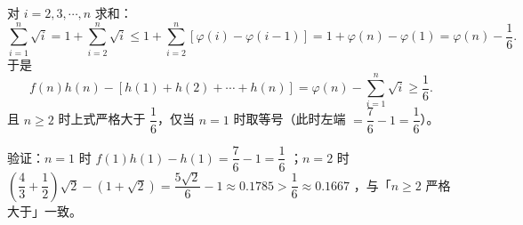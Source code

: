 \begin{answer}
对 $i=2,3,\cdots,n$ 求和：
\nopagebreak[4]
\[
\sum_{i=1}^{n}\sqrt i=1+\sum_{i=2}^{n}\sqrt i\leqslant 1+\sum_{i=2}^{n}\left[\varphi(i)-\varphi(i-1)\right]
=1+\varphi(n)-\varphi(1)=\varphi(n)-\frac16.
\]
于是
\nopagebreak[4]
\[
f(n)h(n)-\left[h(1)+h(2)+\cdots+h(n)\right]=\varphi(n)-\sum_{i=1}^{n}\sqrt i\geqslant\frac16.
\]
且 $n\geqslant2$ 时上式严格大于 $\dfrac16$，仅当 $n=1$ 时取等号（此时左端 $=\dfrac76-1=\dfrac16$）。

验证：$n=1$ 时 $f(1)h(1)-h(1)=\dfrac76-1=\dfrac16$ ；$n=2$ 时 $\left(\dfrac43+\dfrac12\right)\sqrt2-(1+\sqrt2)=\dfrac{5\sqrt2}{6}-1\approx0.1785>\dfrac16\approx0.1667$ ，与「$n\geqslant2$ 严格大于」一致。

\gkanswer{答案（1）：单调递增区间为 $[0,2]$，单调递减区间为 $[2,+\infty)$，极大值为 $25$，无极小值。}



\end{answer}